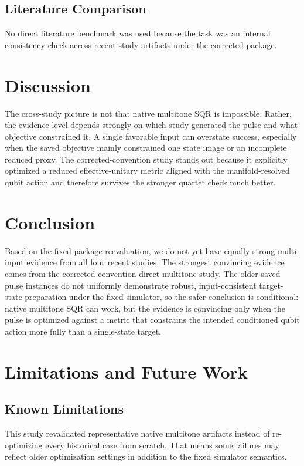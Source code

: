 \documentclass[aps,pra,twocolumn,reprint,amsmath,amssymb]{revtex4-2}
\begin{document}
\subsection{Literature Comparison}
No direct literature benchmark was used because the task was an internal consistency check across recent study artifacts under the corrected package.

\section{Discussion}
The cross-study picture is not that native multitone SQR is impossible. Rather, the evidence level depends strongly on which study generated the pulse and what objective constrained it. A single favorable input can overstate success, especially when the saved objective mainly constrained one state image or an incomplete reduced proxy. The corrected-convention study stands out because it explicitly optimized a reduced effective-unitary metric aligned with the manifold-resolved qubit action and therefore survives the stronger quartet check much better.

\section{Conclusion}
Based on the fixed-package reevaluation, we do not yet have equally strong multi-input evidence from all four recent studies. The strongest convincing evidence comes from the corrected-convention direct multitone study. The older saved pulse instances do not uniformly demonstrate robust, input-consistent target-state preparation under the fixed simulator, so the safer conclusion is conditional: native multitone SQR can work, but the evidence is convincing only when the pulse is optimized against a metric that constrains the intended conditioned qubit action more fully than a single-state target.

\section{Limitations and Future Work}
\subsection{Known Limitations}
This study revalidated representative native multitone artifacts instead of re-optimizing every historical case from scratch. That means some failures may reflect older optimization settings in addition to the fixed simulator semantics.
\end{document}
